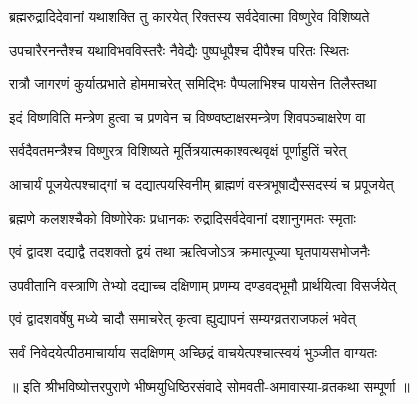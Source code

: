 \twolineshloka
{ब्रह्मरुद्रादिदेवानां यथाशक्ति तु कारयेत्}
{रिक्तस्य सर्वदेवात्मा विष्णुरेव विशिष्यते} %

\twolineshloka
{उपचारैरनन्तैश्च यथाविभवविस्तरैः}
{नैवेद्यैः पुष्पधूपैश्च दीपैश्च परितः स्थितः} %

\twolineshloka
{रात्रौ जागरणं कुर्यात्प्रभाते होममाचरेत्}
{समिद्भिः पैप्पलाभिश्च पायसेन तिलैस्तथा} %

\twolineshloka
{इदं विष्णविति मन्त्रेण हुत्वा च प्रणवेन च}
{विष्ण्वष्टाक्षरमन्त्रेण शिवपञ्चाक्षरेण वा} %

\twolineshloka
{सर्वदैवतमन्त्रैश्च विष्णुरत्र विशिष्यते}
{मूर्तित्रयात्मकाश्वत्थवृक्षं पूर्णाहुतिं चरेत्} %

\twolineshloka
{आचार्यं पूजयेत्पश्चाद्गां च दद्यात्पयस्विनीम्}
{ब्राह्मणं वस्त्रभूषाद्यैस्सदस्यं च प्रपूजयेत्} %

\twolineshloka
{ब्रह्मणे कलशश्चैको विष्णोरेकः प्रधानकः}
{रुद्रादिसर्वदेवानां दशानुगमतः स्मृताः} %

\twolineshloka
{एवं द्वादश दद्याद्वै तदशक्तो द्वयं तथा}
{ऋत्विजोऽत्र क्रमात्पूज्या घृतपायसभोजनैः} %

\twolineshloka
{उपवीतानि वस्त्राणि तेभ्यो दद्याच्च दक्षिणाम्}
{प्रणम्य दण्डवद्भूमौ प्रार्थयित्वा विसर्जयेत्} %

\twolineshloka
{एवं द्वादशवर्षेषु मध्ये चादौ समाचरेत्}
{कृत्वा ह्युद्यापनं सम्यग्व्रतराजफलं भवेत्} %

\twolineshloka
{सर्वं निवेदयेत्पीठमाचार्याय सदक्षिणम्}
{अच्छिद्रं वाचयेत्पश्चात्स्वयं भुञ्जीत वाग्यतः} %

॥ इति श्रीभविष्योत्तरपुराणे भीष्मयुधिष्ठिरसंवादे सोमवती-अमावास्या-व्रतकथा सम्पूर्णा ॥
